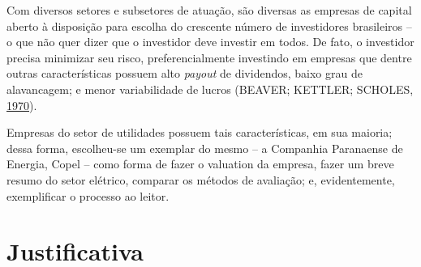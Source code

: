 \documentclass[grad,numbers]{coppe}
\begin{document}
  Com diversos setores e subsetores de atuação, são diversas as empresas de capital aberto à disposição para escolha do crescente número de investidores brasileiros -- o que não quer dizer que o investidor deve investir em todos. De fato, o investidor precisa minimizar seu risco, preferencialmente investindo em empresas que dentre outras características possuem alto \emph{payout} de dividendos, baixo grau de alavancagem; e menor variabilidade de lucros (BEAVER; KETTLER; SCHOLES, \protect\hyperlink{ref-beaver1970}{1970}).

  Empresas do setor de utilidades possuem tais características, em sua maioria; dessa forma, escolheu-se um exemplar do mesmo -- a Companhia Paranaense de Energia, Copel -- como forma de fazer o valuation da empresa, fazer um breve resumo do setor elétrico, comparar os métodos de avaliação; e, evidentemente, exemplificar o processo ao leitor.

  \hypertarget{justificativa}{%
  \section{Justificativa}\label{justificativa}}
\end{document}
